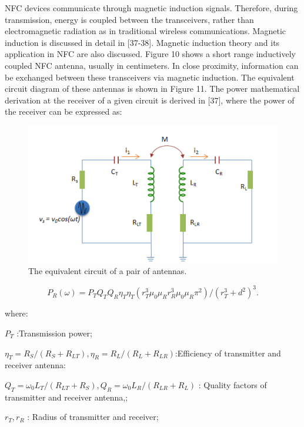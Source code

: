\documentclass[journal]{IEEEtran}
\begin{document}
NFC devices communicate through magnetic induction signals. Therefore, during transmission, energy is coupled between the transceivers, rather than electromagnetic radiation as in traditional wireless communications. Magnetic induction is discussed in detail in [37-38]. Magnetic induction theory and its application in NFC are also discussed. Figure 10 shows a short range inductively coupled NFC antenna, usually in centimeters. In close proximity, information can be exchanged between these transceivers via magnetic induction. The equivalent circuit diagram of these antennas is shown in Figure 11. The power mathematical derivation at the receiver of a given circuit is derived in [37], where the power of the receiver can be expressed as:

\begin{figure}[htbp]
\centerline{\includegraphics[scale=0.35]{EquivalentcircuitofinFigur1.png}}
\caption{The equivalent circuit of a pair of antennas.}
\label{fig}
\end{figure}

$$ P_{R}(\omega)=P_{T}Q_{T}Q_{R}\eta_{T}\eta_{T}(r_{T}^{3}\mu_{0}\mu_{R}r_{R}^{3}\mu_{0}\mu_{R}\pi^{2})/(r_{T}^{3}+d^{2})^{3}.$$

where:

$P_{T}$    :Transmission power;
           
 $\eta_{T}=R_{S}/(R_{S}+R_{LT}),\eta_{R}=R_{L}/
(R_{L}+R_{LR})$:Efficiency of transmitter and receiver antenna:
                      



$Q_{T}=\omega_{0}L_{T}/(R_{LT}+R_{S}),Q_{R}=\omega_{0}L_{R}/(R_{LR}+R_{L})$         : Quality factors of transmitter and receiver antenna,;

$r_{T},r_{R}$            : Radius of transmitter and receiver;
           
\end{document}
